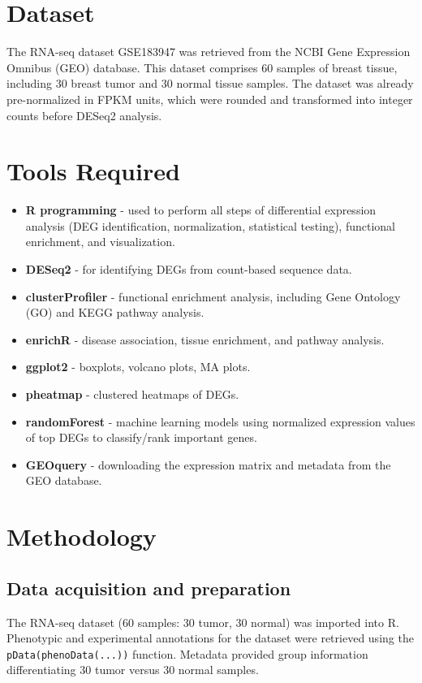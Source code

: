\documentclass[12pt]{article}
\begin{document}
\section{Dataset}
The RNA-seq dataset GSE183947 was retrieved from the NCBI Gene Expression
Omnibus (GEO) database. This dataset comprises 60 samples of breast tissue,
including 30 breast tumor and 30 normal tissue samples. The dataset was
already pre-normalized in FPKM units, which were rounded and transformed into
integer counts before DESeq2 analysis.

\section{Tools Required}
\begin{itemize}
  \item \textbf{R programming} - used to perform all steps of differential
        expression analysis (DEG identification, normalization, statistical
        testing), functional enrichment, and visualization.
  \item \textbf{DESeq2} - for identifying DEGs from count-based sequence data.
  \item \textbf{clusterProfiler} - functional enrichment analysis, including
        Gene Ontology (GO) and KEGG pathway analysis.
  \item \textbf{enrichR} - disease association, tissue enrichment, and
        pathway analysis.
  \item \textbf{ggplot2} - boxplots, volcano plots, MA plots.
  \item \textbf{pheatmap} - clustered heatmaps of DEGs.
  \item \textbf{randomForest} - machine learning models using normalized
        expression values of top DEGs to classify/rank important genes.
  \item \textbf{GEOquery} - downloading the expression matrix and metadata
        from the GEO database.
\end{itemize}

\section{Methodology}

\subsection{Data acquisition and preparation}
The RNA-seq dataset (60 samples: 30 tumor, 30 normal) was imported into R.
Phenotypic and experimental annotations for the dataset were retrieved using
the \texttt{pData(phenoData(...))} function. Metadata provided group
information differentiating 30 tumor versus 30 normal samples.
\end{document}

